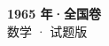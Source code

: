 \documentclass[zihao=-4, a4paper]{ctexart}
\begin{document}
\begin{center}
  {\Large\bfseries 1965 年·全国卷}\\[4pt]
  {\large 数学 · 试题版}
\end{center}
\medskip
{}

\end{document}
